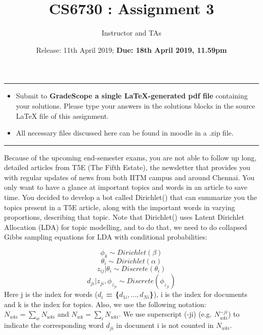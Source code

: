 \documentclass[addpoints,11pt,a4paper]{exam}
\title{CS6730 : Assignment 3}
\author{Instructor and TAs}
\date{Release: 11th April 2019; {\bf Due: 18th April 2019, 11.59pm}}
\begin{document}
\maketitle
\noindent\rule{\textwidth}{1pt}
\begin{itemize}
    \item Submit to {\bf GradeScope a single LaTeX-generated pdf file} containing your solutions. Please type your answers in the solutions blocks in the source LaTeX file of this assignment.
    \item All necessary files discussed here can be found in moodle in a .zip file.
\end{itemize}
\noindent\rule{\textwidth}{1pt}

\begin{questions}

Because of the upcoming end-semester exams, you are not able to follow up long, detailed articles from T5E (The Fifth Estate), the newsletter that provides you with regular updates of news from both IITM campus and around Chennai. You only want to have a glance at important topics and words in an article to save time. You decided to develop a bot called Dirichlet() that can summarize you the topics present in a T5E article, along with the important words in varying proportions, describing that topic. Note that Dirichlet() uses Latent Dirichlet Allocation (LDA) for topic modelling, and to do that, we need to do collapsed Gibbs sampling equations for LDA with conditional probabilities:

\begin{equation}
    \phi_{k}  \sim Dirichlet(\beta)
\end{equation}
\begin{equation}
    \theta_{i}  \sim Dirichlet(\alpha)
\end{equation}
\begin{equation}
    z_{ij}|\theta_{i}  \sim Discrete(\theta_{i})
\end{equation}
\begin{equation}
    d_{ji}|z_{ji},\phi_{z_{ji}}  \sim Discrete(\phi_{z_{ji}})
\end{equation}
Here j is the index for words (\textbf{$d_{i}$ = \{$d_{1i}, ... , d_{Ni} $\}}), i is the index for documents and k is the index for topics. Also, we use the following notation: $N_{wki} = \sum_{w} N_{wki}$ and $N_{wk} = \sum_{i} N_{wki}$. We use superscript (-ji)  (e.g. $N_{wki}^{-ji}$) to indicate the corresponding word  $d_{ji}$ in document i is not counted in $N_{wki}$.


\end{questions}
\end{document}

